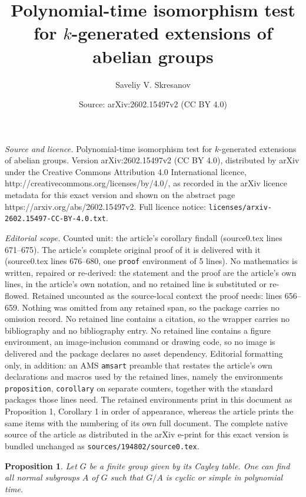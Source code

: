\documentclass[10pt,a4paper]{amsart}
\title{Polynomial-time isomorphism test for $k$-generated extensions of abelian groups}
\author{Saveliy V. Skresanov}
\date{Source: arXiv:2602.15497v2 (CC BY 4.0)}
\newtheorem{proposition}{Proposition}
\begin{document}
\maketitle

\noindent\emph{Source and licence.} Polynomial-time isomorphism test for $k$-generated extensions of abelian groups. Version arXiv:2602.15497v2 (CC BY 4.0), distributed by arXiv under the Creative Commons Attribution 4.0 International licence, http://creativecommons.org/licenses/by/4.0/, as recorded in the arXiv licence metadata for this exact version and shown on the abstract page https://arxiv.org/abs/2602.15497v2. Full licence notice: \texttt{licenses/arxiv-2602.15497-CC-BY-4.0.txt}.\par\smallskip

\noindent\textit{Editorial scope.} Counted unit: the article's corollary findall (source0.tex lines 671--675). The article's complete original proof of it is delivered with it (source0.tex lines 676--680, one \texttt{proof} environment of 5 lines). No mathematics is written, repaired or re-derived: the statement and the proof are the article's own lines, in the article's own notation, and no retained line is substituted or re-flowed.  Retained uncounted as the source-local context the proof needs: lines 656--659.  Nothing was omitted from any retained span, so the package carries no omission record.  No retained line contains a citation, so the wrapper carries no bibliography and no bibliography entry.  No retained line contains a figure environment, an image-inclusion command or drawing code, so no image is delivered and the package declares no asset dependency.  Editorial formatting only, in addition: an AMS \texttt{amsart} preamble that restates the article's own declarations and macros used by the retained lines, namely the environments \texttt{proposition}, \texttt{corollary} on separate counters, together with the standard packages those lines need.  The retained environments print in this document as Proposition 1, Corollary 1 in order of appearance, whereas the article prints the same items with the numbering of its own full document.  The complete native source of the article as distributed in the arXiv e-print for this exact version is bundled unchanged as \texttt{sources/194802/source0.tex}.
\begin{proposition}\label{findcf}
	Let \( G \) be a finite group given by its Cayley table.
	One can find all normal subgroups \( A \) of \( G \) such that \( G/A \) is cyclic or simple in polynomial time.
\end{proposition}
\end{document}
